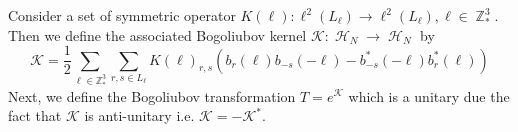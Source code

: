 \documentclass[sn-mathphys,Numbered, a4paper ,nocrop]{sn-jnl}%
\DeclareMathOperator{\Z}{\mathbb{Z}}
\DeclareMathOperator{\HH}{\mathcal{H}}
\newcommand{\half}{\frac{1}{2}}
\theoremstyle{plain}
\newtheorem{lemma}[theorem]{Lemma}
\theoremstyle{definition}
\theoremstyle{remark}
\theoremstyle{plain}
\theoremstyle{definition}
\theoremstyle{remark}
\begin{document}
Consider a set of symmetric operator $K(\ell):\ell^2(L_\ell)\rightarrow \ell^2(L_\ell), \ell \in \Z^3_*$. Then we define the associated Bogoliubov kernel $\mathcal{K}:\HH_N\rightarrow\HH_N $ by
\begin{equation}
\mathcal{K} = \frac{1}{2}\sum\limits_{\ell\in \mathbb{Z}^3_*}\sum\limits_{r,s\in L_\ell}K(\ell)_{r,s}\left(b_r(\ell)b_{-s}(-\ell)-b^*_{-s}(-\ell)b^*_{r}(\ell)\right)
\end{equation}
Next, we define the Bogoliubov transformation $T = e^{\mathcal{K}} $ which is a unitary due the fact that $\mathcal{K}$ is anti-unitary i.e. $\mathcal{K}=-\mathcal{K}^* $.
\end{document}
